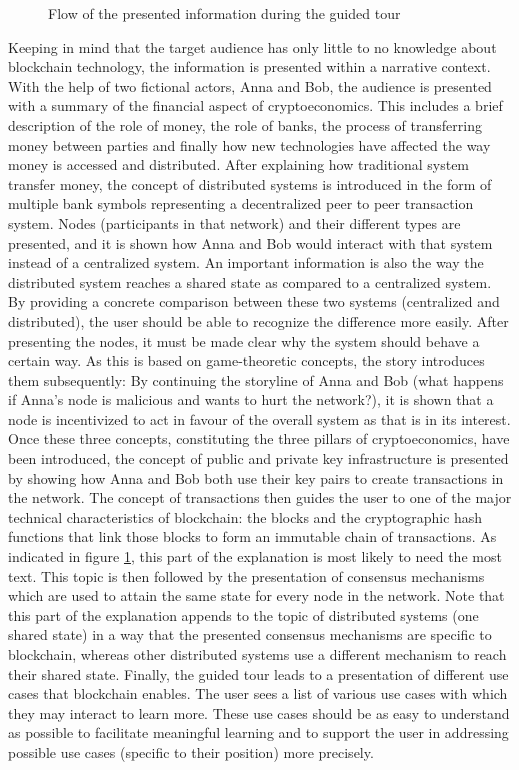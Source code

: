 \begin{figure}
 \centering
 
 \caption{Flow of the presented information during the guided tour}
    \label{fig:DesignConcept}
\end{figure}

Keeping in mind that the target audience has only little to no knowledge about blockchain technology, the information is presented within a narrative context. With the help of two fictional actors, Anna and Bob, the audience is presented with a summary of the financial aspect of cryptoeconomics. This includes a brief description of the role of money, the role of banks, the process of transferring money between parties and finally how new technologies have affected the way money is accessed and distributed. After explaining how traditional system transfer money, the concept of distributed systems is introduced in the form of multiple bank symbols representing a decentralized peer to peer transaction system. Nodes (participants in that network) and their different types are presented, and it is shown how Anna and Bob would interact with that system instead of a centralized system. An important information is also the way the distributed system reaches a shared state as compared to a centralized system. By providing a concrete comparison between these two systems (centralized and distributed), the user should be able to recognize the difference more easily. After presenting the nodes, it must be made clear why the system should behave a certain way. As this is based on game-theoretic concepts, the story introduces them subsequently: By continuing the storyline of Anna and Bob (what happens if Anna's node is malicious and wants to hurt the network?), it is shown that a node is incentivized to act in favour of the overall system as that is in its interest. Once these three concepts, constituting the three pillars of cryptoeconomics, have been introduced, the concept of public and private key infrastructure is presented by showing how Anna and Bob both use their key pairs to create transactions in the network. The concept of transactions then guides the user to one of the major technical characteristics of blockchain: the blocks and the cryptographic hash functions that link those blocks to form an immutable chain of transactions. As indicated in figure \ref{fig:DesignConcept}, this part of the explanation is most likely to need the most text. This topic is then followed by the presentation of consensus mechanisms which are used to attain the same state for every node in the network. Note that this part of the explanation appends to the topic of distributed systems (one shared state) in a way that the presented consensus mechanisms are specific to blockchain, whereas other distributed systems use a different mechanism to reach their shared state. Finally, the guided tour leads to a presentation of different use cases that blockchain enables. The user sees a list of various use cases with which they may interact to learn more. These use cases should be as easy to understand as possible to facilitate meaningful learning and to support the user in addressing possible use cases (specific to their position) more precisely.

